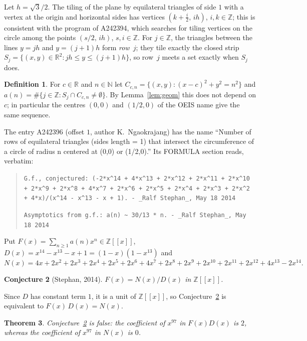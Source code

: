 \documentclass[11pt]{amsart}
\theoremstyle{plain}
\newtheorem{theorem}{Theorem}
\newtheorem{conjecture}[theorem]{Conjecture}
\theoremstyle{definition}
\newtheorem{definition}[theorem]{Definition}
\newcommand{\N}{\mathbb{N}}
\newcommand{\Z}{\mathbb{Z}}
\newcommand{\R}{\mathbb{R}}
\newcommand{\fps}{\Z[\![x]\!]}
\begin{document}
Let $h=\sqrt3/2$. The tiling of the plane by equilateral triangles of side $1$ with a vertex at the origin and horizontal sides has vertices $(k+\tfrac i2,\,ih)$, $i,k\in\Z$; this is consistent with the program of A242394, which searches for tiling vertices on the circle among the points $(s/2,\,ih)$, $s,i\in\Z$. For $j\in\Z$, the triangles between the lines $y=jh$ and $y=(j+1)h$ form \emph{row~$j$}; they tile exactly the closed strip $S_j=\{(x,y)\in\R^2 : jh\le y\le (j+1)h\}$, so row~$j$ meets a set exactly when $S_j$ does.

\begin{definition}\label{def:a}
For $c\in\R$ and $n\in\N$ let $C_{c,n}=\{(x,y):(x-c)^2+y^2=n^2\}$ and $a(n)=\#\{j\in\Z : S_j\cap C_{c,n}\neq\emptyset\}$. By Lemma~\ref{lem:geom} this does not depend on $c$; in particular the centres $(0,0)$ and $(1/2,0)$ of the OEIS name give the same sequence.
\end{definition}

The entry A242396 \cite{A242396} (offset $1$, author K.~Ngaokrajang) has the name ``Number of rows of equilateral triangles (sides length = 1) that intersect the circumference of a circle of radius n centered at (0,0) or (1/2,0).'' Its FORMULA section reads, verbatim:
\begin{quote}
{\small\texttt{G.f., conjectured: (-2*x\^{}14 + 4*x\^{}13 + 2*x\^{}12 + 2*x\^{}11 + 2*x\^{}10 + 2*x\^{}9 + 2*x\^{}8 + 4*x\^{}7 + 2*x\^{}6 + 2*x\^{}5 + 2*x\^{}4 + 2*x\^{}3 + 2*x\^{}2 + 4*x)/(x\^{}14 - x\^{}13 - x + 1). - \_Ralf Stephan\_, May 18 2014}}

{\small\texttt{Asymptotics from g.f.: a(n) \textasciitilde{} 30/13 * n. - \_Ralf Stephan\_, May 18 2014}}
\end{quote}
Put $F(x)=\sum_{n\ge1}a(n)x^n\in\fps$, $D(x)=x^{14}-x^{13}-x+1=(1-x)(1-x^{13})$ and
\[
  N(x)=4x+2x^2+2x^3+2x^4+2x^5+2x^6+4x^7+2x^8+2x^9+2x^{10}+2x^{11}+2x^{12}+4x^{13}-2x^{14}.
\]

\begin{conjecture}[Stephan, 2014]\label{conj}
$F(x)=N(x)/D(x)$ in $\fps$.
\end{conjecture}

Since $D$ has constant term $1$, it is a unit of $\fps$, so Conjecture~\ref{conj} is equivalent to $F(x)\,D(x)=N(x)$.

\begin{theorem}\label{thm:main}
Conjecture~\ref{conj} is false: the coefficient of $x^{97}$ in $F(x)D(x)$ is $2$, whereas the coefficient of $x^{97}$ in $N(x)$ is $0$.
\end{theorem}
\end{document}
